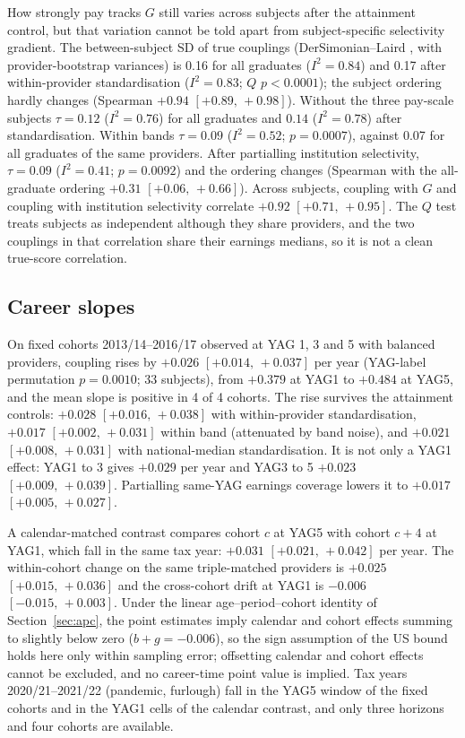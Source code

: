 \documentclass[11pt]{article}
\newcommand{\ci}[2]{$[#1,\allowbreak\,#2]$}
\begin{document}
How strongly pay tracks $G$ still varies across subjects after the attainment control, but that variation cannot
be told apart from subject-specific selectivity gradient. The between-subject SD of true couplings
(DerSimonian--Laird \citep{dersimonian1986meta}, with provider-bootstrap variances) is 0.16 for all graduates ($I^2=0.84$) and 0.17 after
within-provider standardisation ($I^2=0.83$; $Q$ $p<0.0001$); the subject ordering hardly changes (Spearman $+0.94$
\ci{+0.89}{+0.98}). Without the three pay-scale subjects $\tau=0.12$ ($I^2=0.76$) for all graduates and
$0.14$ ($I^2=0.78$) after standardisation. Within bands $\tau=0.09$ ($I^2=0.52$;
$p=0.0007$), against 0.07 for all graduates of the same providers. After partialling institution selectivity,
$\tau=0.09$ ($I^2=0.41$; $p=0.0092$) and the ordering changes (Spearman with the all-graduate ordering $+0.31$
\ci{+0.06}{+0.66}). Across subjects, coupling with $G$ and coupling with institution selectivity correlate $+0.92$
\ci{+0.71}{+0.95}. The $Q$ test treats subjects as independent although they share providers, and the two couplings
in that correlation share their earnings medians, so it is not a clean true-score correlation.

\subsection{Career slopes}\label{sec:ukcareer}

On fixed cohorts 2013/14--2016/17 observed at YAG 1, 3 and 5 with balanced providers, coupling rises by $+0.026$
\ci{+0.014}{+0.037} per year (YAG-label permutation $p=0.0010$; 33 subjects), from $+0.379$ at YAG1 to $+0.484$ at
YAG5, and the mean slope is positive in 4 of 4 cohorts. The rise survives the attainment controls: $+0.028$
\ci{+0.016}{+0.038} with within-provider standardisation, $+0.017$ \ci{+0.002}{+0.031} within band (attenuated by band
noise), and $+0.021$ \ci{+0.008}{+0.031} with national-median standardisation. It is not only a YAG1 effect: YAG1 to 3
gives $+0.029$ per year and YAG3 to 5 $+0.023$ \ci{+0.009}{+0.039}. Partialling same-YAG earnings coverage lowers it to
$+0.017$ \ci{+0.005}{+0.027}.

A calendar-matched contrast compares cohort $c$ at YAG5 with cohort $c+4$ at YAG1, which fall in the same tax
year: $+0.031$ \ci{+0.021}{+0.042} per year. The within-cohort change on the same triple-matched providers is $+0.025$
\ci{+0.015}{+0.036} and the cross-cohort drift at YAG1 is $-0.006$ \ci{-0.015}{+0.003}. Under the linear
age--period--cohort identity of Section~\ref{sec:apc}, the point estimates imply calendar and cohort effects summing
to slightly below zero ($b+g=-0.006$), so the sign assumption of the US bound holds here only within sampling error;
offsetting calendar and cohort effects cannot be excluded, and no career-time point value is implied. Tax years 2020/21--2021/22 (pandemic, furlough) fall in the YAG5 window of the fixed cohorts and in the YAG1
cells of the calendar contrast, and only three horizons and four cohorts are available.
\end{document}
